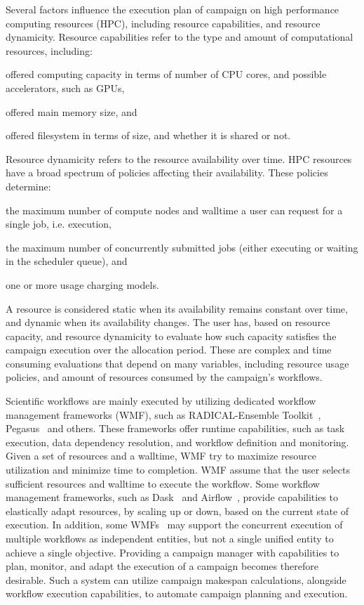 Several factors influence the execution plan of campaign on high performance computing resources (HPC), including resource capabilities, and resource dynamicity.
Resource capabilities refer to the type and amount of computational resources, including: 
\begin{inparaenum}[1)]
\item offered computing capacity in terms of number of CPU cores, and possible accelerators, such as GPUs,
\item offered main memory size, and
\item offered filesystem in terms of size, and whether it is shared or not.
\end{inparaenum} 
Resource dynamicity refers to the resource availability over time.
HPC resources have a broad spectrum of policies affecting their availability. 
These policies determine:
\begin{inparaenum}[1)]
\item the maximum number of compute nodes and walltime a user can request for a single job, i.e. execution,
\item the maximum number of concurrently submitted jobs (either executing or waiting in the scheduler queue), and
\item one or more usage charging models.
\end{inparaenum}
A resource is considered static when its availability remains constant over time, and dynamic when its availability changes.
The user has, based on resource capacity, and resource dynamicity to evaluate how such capacity satisfies the campaign execution over the allocation period.
These are complex and time consuming evaluations that depend on many variables, including resource usage policies, and amount of resources consumed by the campaign’s workflows.

Scientific workflows are mainly executed by utilizing dedicated workflow management frameworks (WMF), such as RADICAL-Ensemble Toolkit~\cite{balasubramanian2018harnessing}, Pegasus~\cite{deelman2015pegasus} and others.
These frameworks offer runtime capabilities, such as task execution, data dependency resolution, and workflow definition and monitoring.
Given a set of resources and a walltime, WMF try to maximize resource utilization and minimize time to completion.
WMF assume that the user selects sufficient resources and walltime to execute the workflow.
Some workflow management frameworks, such as Dask~\cite{rocklin2015dask} and Airflow~\cite{airflow}, provide capabilities to elastically adapt resources, by scaling up or down, based on the current state of execution.
In addition, some  WMFs~\cite{deelman2015pegasus} may support the concurrent execution of multiple workflows as independent entities, but not a single unified entity to achieve a single objective.
Providing a campaign manager with capabilities to plan, monitor, and adapt the execution of a campaign becomes therefore desirable.
Such a system can utilize campaign makespan calculations, alongside workflow execution capabilities, to automate campaign planning and execution. 

